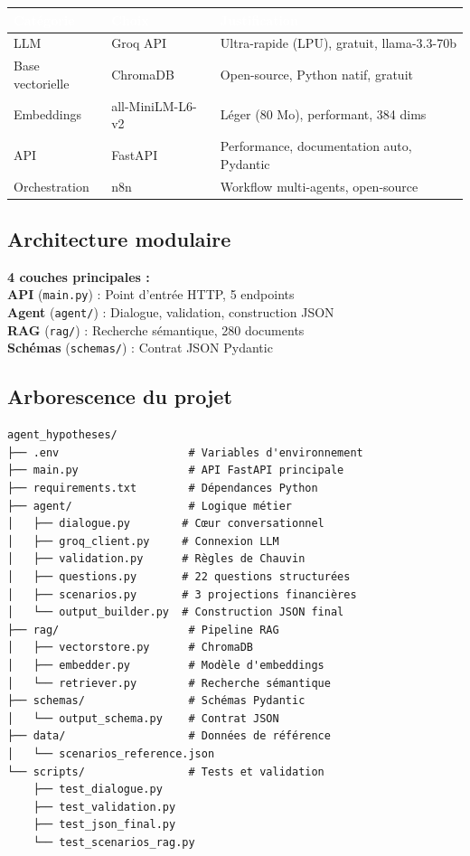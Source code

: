 \documentclass[11pt, a4paper]{article}
\begin{document}
\begin{center}
\begin{tabularx}{0.95\textwidth}{X X X}
\toprule
\rowcolor{navyblue}\textcolor{white}{\textbf{Catégorie}} & \textcolor{white}{\textbf{Choix}} & \textcolor{white}{\textbf{Justification}} \\
\midrule
LLM & Groq API & Ultra-rapide (LPU), gratuit, llama-3.3-70b \\
Base vectorielle & ChromaDB & Open-source, Python natif, gratuit \\
Embeddings & all-MiniLM-L6-v2 & Léger (80 Mo), performant, 384 dims \\
API & FastAPI & Performance, documentation auto, Pydantic \\
Orchestration & n8n & Workflow multi-agents, open-source \\
\bottomrule
\end{tabularx}
\end{center}

\subsection{Architecture modulaire}

\begin{resultbox}
\textbf{4 couches principales :}\\
\textbf{API} (\texttt{main.py}) : Point d'entrée HTTP, 5 endpoints\\
\textbf{Agent} (\texttt{agent/}) : Dialogue, validation, construction JSON\\
\textbf{RAG} (\texttt{rag/}) : Recherche sémantique, 280 documents\\
\textbf{Schémas} (\texttt{schemas/}) : Contrat JSON Pydantic
\end{resultbox}

\subsection{Arborescence du projet}

\begin{Verbatim}[fontsize=\small,frame=single]
agent_hypotheses/
├── .env                    # Variables d'environnement
├── main.py                 # API FastAPI principale
├── requirements.txt        # Dépendances Python
├── agent/                  # Logique métier
│   ├── dialogue.py        # Cœur conversationnel
│   ├── groq_client.py     # Connexion LLM
│   ├── validation.py      # Règles de Chauvin
│   ├── questions.py       # 22 questions structurées
│   ├── scenarios.py       # 3 projections financières
│   └── output_builder.py  # Construction JSON final
├── rag/                    # Pipeline RAG
│   ├── vectorstore.py      # ChromaDB
│   ├── embedder.py         # Modèle d'embeddings
│   └── retriever.py        # Recherche sémantique
├── schemas/                # Schémas Pydantic
│   └── output_schema.py    # Contrat JSON
├── data/                   # Données de référence
│   └── scenarios_reference.json
└── scripts/                # Tests et validation
    ├── test_dialogue.py
    ├── test_validation.py
    ├── test_json_final.py
    └── test_scenarios_rag.py
\end{Verbatim}
\end{document}
